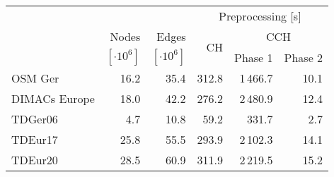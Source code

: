 \begin{tabular}{lrrrrr}
\toprule
 &                &                & \multicolumn{3}{c}{Preprocessing [s]} \\ \cmidrule(lr){4-6} & Nodes          & Edges          & \multirow{2}{*}{CH} & \multicolumn{2}{c}{CCH} \\ \cmidrule(lr){5-6} & $[\cdot 10^6]$ & $[\cdot 10^6]$ &                     & Phase 1 & Phase 2 \\
\midrule
OSM Ger       &       16.2 &       35.4 &                          312.8 &        1\,466.7 &          10.1 \\
DIMACs Europe &       18.0 &       42.2 &                          276.2 &        2\,480.9 &          12.4 \\
TDGer06       &        4.7 &       10.8 &                           59.2 &         331.7 &           2.7 \\
TDEur17       &       25.8 &       55.5 &                          293.9 &        2\,102.3 &          14.1 \\
TDEur20       &       28.5 &       60.9 &                          311.9 &        2\,219.5 &          15.2 \\
\bottomrule
\end{tabular}

